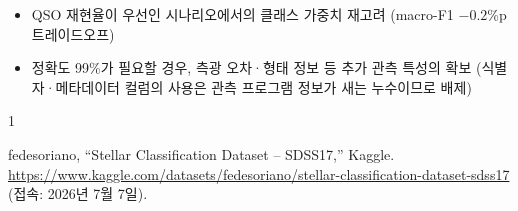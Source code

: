 \documentclass[11pt,a4paper]{article}
\begin{document}
\begin{itemize}
  \item QSO 재현율이 우선인 시나리오에서의 클래스 가중치 재고려
        (macro-F1 $-0.2$\%p 트레이드오프)
  \item 정확도 99\%가 필요할 경우, 측광 오차·형태 정보 등 추가 관측 특성의 확보
        (식별자·메타데이터 컬럼의 사용은 관측 프로그램 정보가 새는 누수이므로
        배제)
\end{itemize}

\begin{thebibliography}{1}

fedesoriano, ``Stellar Classification Dataset -- SDSS17,'' Kaggle.
\url{https://www.kaggle.com/datasets/fedesoriano/stellar-classification-dataset-sdss17}
(접속: 2026년 7월 7일).

\end{thebibliography}
\end{document}
